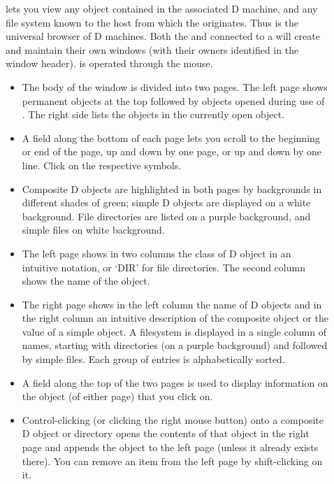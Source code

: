 \begin{description}
\item[] lets you view any object contained in the
  associated D machine, and any file system known to the host from
  which the  originates. Thus  is the
  universal browser of D machines. Both the  and
   connected to a  will create and
  maintain their own  windows (with their owners
  identified in the window header).  is operated through
  the mouse.

  \begin{itemize}
  \item The body of the window is divided into two pages. The left
    page shows permanent objects at the top followed by objects opened
    during use of . The right side lists the objects in
    the currently open object.

  \item A field along the bottom of each page lets you scroll to the
    beginning or end of the page, up and down by one page, or up and
    down by one line. Click on the respective symbols.

  \item Composite D objects are highlighted in both pages by
    backgrounds in different shades of green; simple D objects are
    displayed on a white background. File directories are listed on a
    purple background, and simple files on white background.

  \item The left page shows in two columns the class of D object in an
    intuitive notation, or `DIR' for file directories. The second
    column shows the name of the object.

  \item The right page shows in the left column the name of D objects
    and in the right column an intuitive description of the composite
    object or the value of a simple object. A filesystem is displayed
    in a single column of names, starting with directories (on a
    purple background) and followed by simple files. Each group of
    entries is alphabetically sorted.

  \item A field along the top of the two pages is used to display
    information on the object (of either page) that you click on.

  \item Control-clicking (or clicking the right mouse button) onto a
    composite D object or directory opens the contents of that object
    in the right page and appends the object to the left page (unless
    it already exists there). You can remove an item from the left
    page by shift-clicking on it.


\end{itemize}
\end{description}
